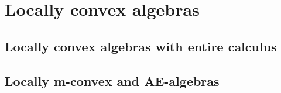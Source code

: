 
\chapter{Locally convex algebras}

\section{Locally convex algebras with entire calculus}
\label{sec:AppB_Entire}

\section{Locally m-convex and AE-algebras}
\label{sec:AppB_AEvsLMC}

